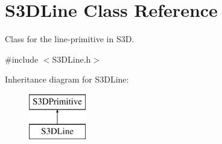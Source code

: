 \hypertarget{class_s3_d_line}{
\section{S3DLine Class Reference}
\label{class_s3_d_line}
}


Class for the line-\/primitive in S3D.  




{\ttfamily \#include $<$S3DLine.h$>$}

Inheritance diagram for S3DLine:\begin{figure}[H]
\begin{center}
\leavevmode
\includegraphics[height=2cm]{class_s3_d_line}
\end{center}
\end{figure}
